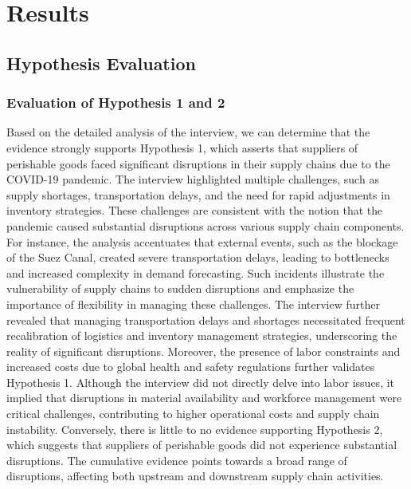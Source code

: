 \chapter{Results}

\section{Hypothesis Evaluation}

\subsection{Evaluation of Hypothesis 1 and 2}

Based on the detailed analysis of the interview, we can determine that the evidence strongly supports Hypothesis 1, which asserts that suppliers of perishable goods faced significant disruptions in their supply chains due to the COVID-19 pandemic. The interview highlighted multiple challenges, such as supply shortages, transportation delays, and the need for rapid adjustments in inventory strategies. These challenges are consistent with the notion that the pandemic caused substantial disruptions across various supply chain components. For instance, the analysis accentuates that external events, such as the blockage of the Suez Canal, created severe transportation delays, leading to bottlenecks and increased complexity in demand forecasting. Such incidents illustrate the vulnerability of supply chains to sudden disruptions and emphasize the importance of flexibility in managing these challenges. The interview further revealed that managing transportation delays and shortages necessitated frequent recalibration of logistics and inventory management strategies, underscoring the reality of significant disruptions. Moreover, the presence of labor constraints and increased costs due to global health and safety regulations further validates Hypothesis 1. Although the interview did not directly delve into labor issues, it implied that disruptions in material availability and workforce management were critical challenges, contributing to higher operational costs and supply chain instability. Conversely, there is little to no evidence supporting Hypothesis 2, which suggests that suppliers of perishable goods did not experience substantial disruptions. The cumulative evidence points towards a broad range of disruptions, affecting both upstream and downstream supply chain activities.

